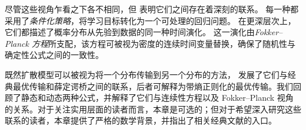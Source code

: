 尽管这些视角乍看之下各不相同，但 表明它们之间存在着深刻的联系。
每一种都采用了\emph{条件化策略}，将学习目标转化为一个可处理的回归问题。
在更深层次上，它们都描述了概率分布从先验到数据的同一种时间演化。
这一演化由\emph{Fokker–Planck 方程}所支配，该方程可被视为密度的连续时间变量替换，确保了随机性与确定性公式之间的一致性。

既然扩散模型可以被视为将一个分布传输到另一个分布的方法， 发展了它们与经典最优传输和薛定谔桥之间的联系，后者可解释为带熵正则化的最优传输。我们回顾了静态和动态两种公式，并解释了它们与连续性方程以及 Fokker--Planck 视角的关系。对于关注实用层面的读者而言，本章是可选的；但对于希望深入研究这些联系的读者，本章提供了严格的数学背景，并指出了相关经典文献的入口。


